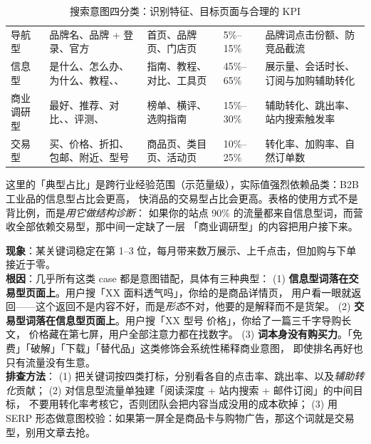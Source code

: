 \begin{table}[htbp]
\centering
\caption{搜索意图四分类：识别特征、目标页面与合理的 KPI}
\label{tab:intent}
\small
\begin{tabularx}{\textwidth}{L{1.9cm} L{2.9cm} L{2.6cm} L{2.3cm} Y}
\toprule
{} &  &  &  &  \\
\midrule
导航型 & 品牌名、品牌 + 登录、官方 & 首页、品牌页、门店页 & 5\%--15\% & 品牌词点击份额、防竞品截流 \\
信息型 & 是什么、怎么办、为什么、教程、、 & 指南、教程、对比、工具页 & 45\%--65\% & 展示量、会话时长、订阅与加购辅助转化 \\
商业调研型 & 最好、推荐、对比、、评测、 & 榜单、横评、选购指南 & 15\%--30\% & 辅助转化、跳出率、站内搜索触发率 \\
交易型 & 买、价格、折扣、包邮、附近、型号 & 商品页、类目页、活动页 & 10\%--25\% & 转化率、加购率、自然订单数 \\
\bottomrule
\end{tabularx}
\end{table}

这里的「典型占比」是跨行业经验范围（示范量级），实际值强烈依赖品类：B2B 工业品的信息型占比会更高，
快消品的交易型占比会更高。表格的使用方式不是背比例，而是\emph{用它做结构诊断}：
如果你的站点 90\% 的流量都来自信息型词，而营收全部依赖交易型，那中间一定缺了一层
「商业调研型」的内容把用户接下来。

\begin{pitfall}
\textbf{现象}：某关键词稳定在第 1--3 位，每月带来数万展示、上千点击，但加购与下单接近于零。\\
\textbf{根因}：几乎所有这类 case 都是意图错配，具体有三种典型：
(1) \textbf{信息型词落在交易型页面上}。用户搜「XX 面料透气吗」，你给的是商品详情页，
用户看一眼就返回——这个返回不是内容不好，而是\emph{形态}不对，他要的是解释而不是货架。
(2) \textbf{交易型词落在信息型页面上}。用户搜「XX 型号 价格」，你给了一篇三千字导购长文，
价格藏在第七屏，用户全部注意力都在找数字。
(3) \textbf{词本身没有购买力}。「免费」「破解」「下载」「替代品」这类修饰会系统性稀释商业意图，
即使排名再好也只有流量没有生意。\\
\textbf{排查方法}：
(1) 把关键词按四类打标，分别看各自的点击率、跳出率、以及\emph{辅助转化}贡献；
(2) 对信息型流量单独建「阅读深度 + 站内搜索 + 邮件订阅」的中间目标，
不要用转化率考核它，否则团队会把内容当成没用的成本砍掉；
(3) 用 SERP 形态做意图校验：如果第一屏全是商品卡与购物广告，那这个词就是交易型，别用文章去抢。
\end{pitfall}

